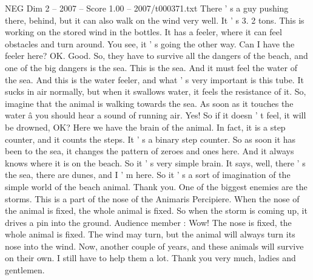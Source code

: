\begin{textsample}{NEG Dim 2 – 2007 – Score 1.00 – 2007/t000371.txt}
There ' s a guy pushing there, behind, but it can also walk on the wind very well.
It ' s 3. 2 tons.
This is working on the stored wind in the bottles.
It has a feeler, where it can feel obstacles and turn around.
You see, it ' s going the other way.
Can I have the feeler here?
OK.
Good.
So, they have to survive all the dangers of the beach, and one of the big dangers is the sea.
This is the sea.
And it must feel the water of the sea.
And this is the water feeler, and what ' s very important is this tube.
It sucks in air normally, but when it swallows water, it feels the resistance of it.
So, imagine that the animal is walking towards the sea.
As soon as it touches the water â you should hear a sound of running air.
Yes!
So if it doesn ' t feel, it will be drowned, OK?
Here we have the brain of the animal.
In fact, it is a step counter, and it counts the steps.
It ' s a binary step counter.
So as soon it has been to the sea, it changes the pattern of zeroes and ones here.
And it always knows where it is on the beach.
So it ' s very simple brain.
It says, well, there ' s the sea, there are dunes, and I ' m here.
So it ' s a sort of imagination of the simple world of the beach animal.
Thank you.
One of the biggest enemies are the storms.
This is a part of the nose of the Animaris Percipiere.
When the nose of the animal is fixed, the whole animal is fixed.
So when the storm is coming up, it drives a pin into the ground.
Audience member : Wow!
The nose is fixed, the whole animal is fixed.
The wind may turn, but the animal will always turn its nose into the wind.
Now, another couple of years, and these animals will survive on their own.
I still have to help them a lot.
Thank you very much, ladies and gentlemen.

\end{textsample}
